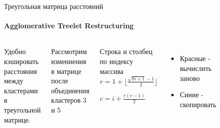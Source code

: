 \begin{frame}{Треугольная матрица расстояний}
    \framesubtitle{Agglomerative Treelet Restructuring}
    \begin{columns}
        Удобно кэшировать расстояния между кластерами в треугольной матрице.

        Рассмотрим измениения в матрице после объединения кластеров 3 и 5
        \begin{block}{Строка и столбец по индексу массива}
            $r = 1 + \lfloor \frac{\sqrt{8i + 1}-1}{2} \rfloor$

            $c = i + \frac{r(r-1)}{2}$
        \end{block}

        \begin{itemize}
            \item 
                Красные - вычислить заново
            \item 
                Синие - скопировать
        \end{itemize}
        \begin{figure}

\end{figure}
\end{columns}
\end{frame}
